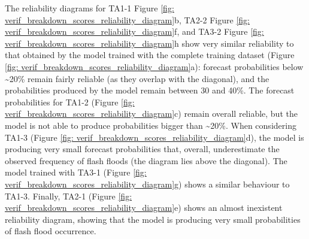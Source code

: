 \begin{figure}[htbp]
\label{fig:verif_breakdown_scores_pr_curve}
\end{figure}

The  reliability diagrams for TA1-1 Figure \ref{fig: verif_breakdown_scores_reliability_diagram}b, TA2-2 Figure \ref{fig: verif_breakdown_scores_reliability_diagram}f, and TA3-2 Figure \ref{fig: verif_breakdown_scores_reliability_diagram}h show very similar reliability to that obtained by the model trained with the complete training dataset (Figure \ref{fig: verif_breakdown_scores_reliability_diagram}a): forecast probabilities below \sim20\% remain fairly reliable (as they overlap with the diagonal), and the probabilities produced by the model remain between 30 and 40\%. The forecast probabilities for TA1-2 (Figure \ref{fig: verif_breakdown_scores_reliability_diagram}c) remain overall reliable, but the model is not able to produce probabilities bigger than \sim20\%. When considering TA1-3 (Figure \ref{fig: verif_breakdown_scores_reliability_diagram}d), the model is producing very small forecast probabilities that, overall, underestimate the observed frequency of flash floods (the diagram lies above the diagonal). The model trained with TA3-1 (Figure \ref{fig: verif_breakdown_scores_reliability_diagram}g) shows a similar behaviour to TA1-3. Finally, TA2-1 (Figure \ref{fig: verif_breakdown_scores_reliability_diagram}e) shows an almost inexistent reliability diagram, showing that the model is producing very small probabilities of flash flood occurrence.   

